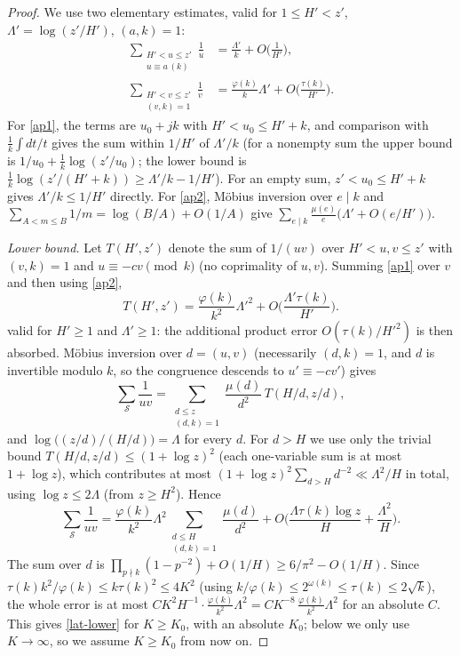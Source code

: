 \documentclass[11pt,reqno]{amsart}
\newcommand{\cS}{\mathcal S}
\begin{document}
\begin{proof}
We use two elementary estimates, valid for $1\le H'<z'$, $\Lambda'=\log(z'/H')$,
$(a,k)=1$:
\begin{align}
 \sum_{\substack{H'<u\le z'\\ u\equiv a\,(k)}}\frac1u
 &=\frac{\Lambda'}{k}+O\Big(\frac1{H'}\Big),\label{ap1}\\
 \sum_{\substack{H'<v\le z'\\ (v,k)=1}}\frac1v
 &=\frac{\varphi(k)}{k}\Lambda'+O\Big(\frac{\tau(k)}{H'}\Big).\label{ap2}
\end{align}
For \eqref{ap1}, the terms are $u_0+jk$ with $H'<u_0\le H'+k$, and comparison
with $\frac1k\int dt/t$ gives the sum within $1/H'$ of $\Lambda'/k$ (for a
nonempty sum the upper bound is $1/u_0+\frac1k\log(z'/u_0)$; the lower bound is
$\frac1k\log(z'/(H'+k))\ge\Lambda'/k-1/H'$).
For an empty sum, $z'<u_0\le H'+k$ gives $\Lambda'/k\le1/H'$ directly.
For \eqref{ap2}, M\"obius inversion over $e\mid k$ and
$\sum_{A<m\le B}1/m=\log(B/A)+O(1/A)$ give
$\sum_{e\mid k}\frac{\mu(e)}e\big(\Lambda'+O(e/H')\big)$.

\emph{Lower bound.}  Let $T(H',z')$ denote the sum of $1/(uv)$ over
$H'<u,v\le z'$ with $(v,k)=1$ and $u\equiv-cv\pmod k$ (no coprimality of
$u,v$).  Summing \eqref{ap1} over $v$ and then using \eqref{ap2},
\[
 T(H',z')=\frac{\varphi(k)}{k^2}\Lambda'^2+O\Big(\frac{\Lambda'\tau(k)}{H'}\Big).
\]
valid for $H'\ge1$ and $\Lambda'\ge1$: the additional product error
$O(\tau(k)/H'^2)$ is then absorbed.  M\"obius inversion over $d=(u,v)$ (necessarily $(d,k)=1$, and $d$ is
invertible modulo $k$, so the congruence descends to $u'\equiv-cv'$) gives
\[
 \sum_{\cS}\frac1{uv}=\sum_{\substack{d\le z\\(d,k)=1}}\frac{\mu(d)}{d^2}\,T(H/d,z/d),
\]
and $\log\big((z/d)/(H/d)\big)=\Lambda$ for every $d$.  For $d>H$ we use
only the trivial bound $T(H/d,z/d)\le(1+\log z)^2$ (each one-variable sum
is at most $1+\log z$), which contributes at most
$(1+\log z)^2\sum_{d>H}d^{-2}\ll\Lambda^2/H$ in total, using
$\log z\le2\Lambda$ (from $z\ge H^2$).  Hence
\[
 \sum_{\cS}\frac1{uv}
 =\frac{\varphi(k)}{k^2}\Lambda^2\sum_{\substack{d\le H\\(d,k)=1}}\frac{\mu(d)}{d^2}
 +O\Big(\frac{\Lambda\tau(k)\log z}{H}+\frac{\Lambda^2}{H}\Big).
\]
The sum over $d$ is $\prod_{p\nmid k}(1-p^{-2})+O(1/H)\ge 6/\pi^2-O(1/H)$.
Since $\tau(k)k^2/\varphi(k)\le k\tau(k)^2\le4K^2$ (using
$k/\varphi(k)\le2^{\omega(k)}\le\tau(k)\le2\sqrt k$), the whole error is at most
$CK^2H^{-1}\cdot\frac{\varphi(k)}{k^2}\Lambda^2= CK^{-8}\,\frac{\varphi(k)}{k^2}\Lambda^2$
for an absolute $C$.  This gives \eqref{lat-lower} for $K\ge K_0$, with an
absolute $K_0$; below we only use $K\to\infty$, so we assume $K\ge K_0$ from
now on.


\end{proof}
\end{document}
